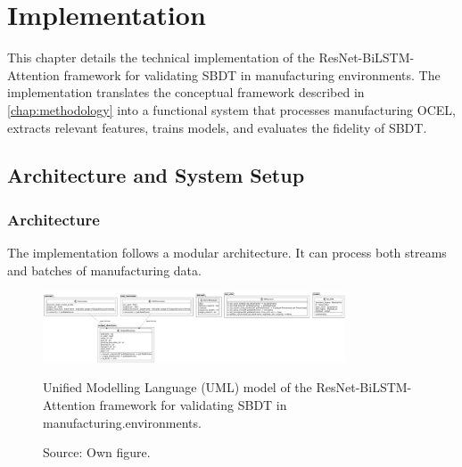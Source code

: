 \chapter{Implementation}
\label{chap:implementation}
This chapter details the technical implementation of the ResNet-BiLSTM-Attention framework \autocite{Fischer2025ResNetBiLSTM} for validating SBDT in manufacturing environments. The implementation translates the conceptual framework described in \autoref{chap:methodology} into a functional system that processes manufacturing OCEL, extracts relevant features, trains models, and evaluates the fidelity of SBDT.

\section{Architecture and System Setup}

\subsection{Architecture}
The implementation follows a modular architecture. It can process both streams and batches of manufacturing data.

\begin{figure}[htbp]
  \centering
  \includegraphics[width=0.8\textwidth]{figures/code.png}
  \caption{Unified Modelling Language (UML) model of the ResNet-BiLSTM-Attention framework for validating SBDT in manufacturing.environments.}
  \caption*{Source: Own figure.}
  \label{fig:DSR}
\end{figure}

